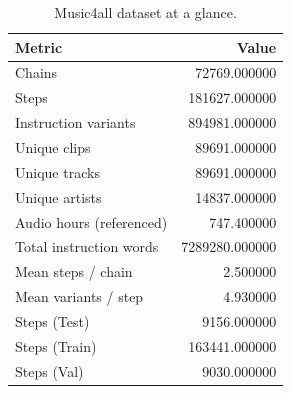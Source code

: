 \begin{table}
\caption{Music4all dataset at a glance.}
\label{tab:music4all_overview}
\begin{tabular}{lr}
\toprule
Metric & Value \\
\midrule
Chains & 72769.000000 \\
Steps & 181627.000000 \\
Instruction variants & 894981.000000 \\
Unique clips & 89691.000000 \\
Unique tracks & 89691.000000 \\
Unique artists & 14837.000000 \\
Audio hours (referenced) & 747.400000 \\
Total instruction words & 7289280.000000 \\
Mean steps / chain & 2.500000 \\
Mean variants / step & 4.930000 \\
Steps (Test) & 9156.000000 \\
Steps (Train) & 163441.000000 \\
Steps (Val) & 9030.000000 \\
\bottomrule
\end{tabular}
\end{table}
